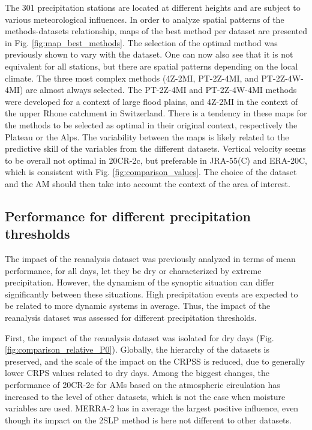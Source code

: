 \documentclass{ametsoc}
\begin{document}
The 301 precipitation stations are located at different heights and are subject to various meteorological influences. In order to analyze spatial patterns of the methods-datasets relationship, maps of the best method per dataset are presented in Fig. \ref{fig:map_best_methods}. The selection of the optimal method was previously shown to vary with the dataset. One can now also see that it is not equivalent for all stations, but there are spatial patterns depending on the local climate. The three most complex methods (4Z-2MI, PT-2Z-4MI, and PT-2Z-4W-4MI) are almost always selected. The PT-2Z-4MI and PT-2Z-4W-4MI methods were developed for a context of large flood plains, and 4Z-2MI in the context of the upper Rhone catchment in Switzerland. There is a tendency in these maps for the methods to be selected as optimal in their original context, respectively the Plateau or the Alps. The variability between the maps is likely related to the predictive skill of the variables from the different datasets. Vertical velocity seems to be overall not optimal in 20CR-2c, but preferable in JRA-55(C) and ERA-20C, which is consistent with Fig. \ref{fig:comparison_values}. The choice of the dataset and the AM should then take into account the context of the area of interest.


\subsection{Performance for different precipitation thresholds}

The impact of the reanalysis dataset was previously analyzed in terms of mean performance, for all days, let they be dry or characterized by extreme precipitation. However, the dynamism of the synoptic situation can differ significantly between these situations. High precipitation events are expected to be related to more dynamic systems in average. Thus, the impact of the reanalysis dataset was assessed for different precipitation thresholds.

First, the impact of the reanalysis dataset was isolated for dry days (Fig. \ref{fig:comparison_relative_P0}). Globally, the hierarchy of the datasets is preserved, and the scale of the impact on the CRPSS is reduced, due to generally lower CRPS values related to dry days. Among the biggest changes, the performance of 20CR-2c for AMs based on the atmospheric circulation has increased to the level of other datasets, which is not the case when moisture variables are used. MERRA-2 has in average the largest positive influence, even though its impact on the 2SLP method is here not different to other datasets.
\end{document}
